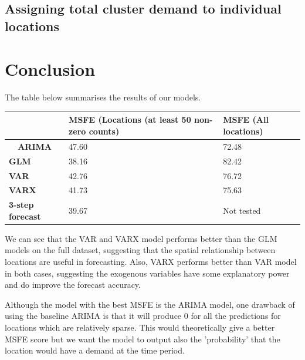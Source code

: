 \documentclass[12pt, letterpaper] {article}
\begin{document}
\subsection{Assigning total cluster demand to individual locations}


\section{Conclusion}
The table below summarises the results of our models. 

\begin{table}[H]
\begin{tabular}{|l|l|l|}
\hline
                                     & \textbf{MSFE (Locations (at least 50 non-zero counts)} & \textbf{MSFE (All locations)} \\ \hline
\multicolumn{1}{|c|}{\textbf{ARIMA}} & 47.60                                                      & 72.48                        \\ \hline
\textbf{GLM}                         & 38.16                                                      & 82.42                         \\ \hline
\textbf{VAR}                         & 42.76                                                      & 76.72                         \\ \hline
\textbf{VARX}                        & 41.73                                                      & 75.63                        \\ \hline
\textbf{3-step forecast}                        & 39.67 & Not tested                       \\ \hline
\end{tabular}
\end{table}

\noindent We can see that the VAR and VARX model performs better than the GLM models on the full dataset, suggesting that the spatial relationship between locations are useful in forecasting. Also, VARX performs better than VAR model in both cases, suggesting the exogenous variables have some explanatory power and do improve the forecast accuracy. 

\noindent Although the model with the best MSFE is the ARIMA model, one drawback of using the baseline ARIMA is that it will produce 0 for all the predictions for locations which are relatively sparse. This would theoretically give a better MSFE score but we want the model to output also the 'probability' that the location would have a demand at the time period. 
\end{document}
